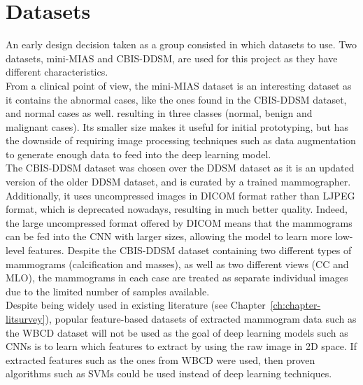\section{Datasets}

An early design decision taken as a group consisted in which datasets to use. Two datasets, mini-MIAS and CBIS-DDSM, are used for this project as they have different characteristics.\\

From a clinical point of view, the mini-MIAS dataset is an interesting dataset as it contains the abnormal cases, like the ones found in the CBIS-DDSM dataset, and normal cases as well. resulting in three classes (normal, benign and malignant cases). Its smaller size makes it useful for initial prototyping, but has the downside of requiring image processing techniques such as data augmentation to generate enough data to feed into the deep learning model.\\

The CBIS-DDSM dataset was chosen over the DDSM dataset as it is an updated version of the older DDSM dataset, and is curated by a trained mammographer. Additionally, it uses uncompressed images in DICOM format rather than LJPEG format, which is deprecated nowadays, resulting in much better quality. Indeed, the large uncompressed format offered by DICOM means that the mammograms can be fed into the CNN with larger sizes, allowing the model to learn more low-level features. Despite the CBIS-DDSM dataset containing two different types of mammograms (calcification and masses), as well as two different views (CC and MLO), the mammograms in each case are treated as separate individual images due to the limited number of samples available.\\

Despite being widely used in existing literature (see Chapter~\ref{ch:chapter-litsurvey}), popular feature-based datasets of extracted mammogram data such as the WBCD dataset will not be used as the goal of deep learning models such as CNNs is to learn which features to extract by using the raw image in 2D space. If extracted features such as the ones from WBCD were used, then proven algorithms such as SVMs could be used instead of deep learning techniques.


